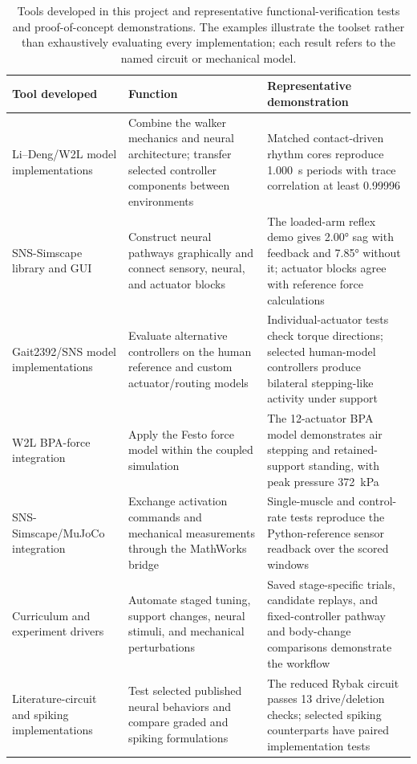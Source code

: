 \begin{table}[htbp]
\caption[Tools developed and representative demonstrations]{Tools developed in this project and representative functional-verification tests and proof-of-concept demonstrations. The examples illustrate the toolset rather than exhaustively evaluating every implementation; each result refers to the named circuit or mechanical model.}
\label{tab:sns_capability}
\small
\begin{tabularx}{\textwidth}{@{}>{\raggedright\arraybackslash}p{}*{2}{>{\raggedright\arraybackslash}X}@{}}
\toprule
\textbf{Tool developed} & \textbf{Function} & \textbf{Representative demonstration} \\
\midrule
Li--Deng/W2L model implementations & Combine the walker mechanics and neural architecture; transfer selected controller components between environments & Matched contact-driven rhythm cores reproduce \qty{1.000}{\second} periods with trace correlation at least 0.99996 \\
SNS-Simscape library and GUI & Construct neural pathways graphically and connect sensory, neural, and actuator blocks & The loaded-arm reflex demo gives \ang{2.00} sag with feedback and \ang{7.85} without it; actuator blocks agree with reference force calculations \\
Gait2392/SNS model implementations & Evaluate alternative controllers on the human reference and custom actuator/routing models & Individual-actuator tests check torque directions; selected human-model controllers produce bilateral stepping-like activity under support \\
W2L BPA-force integration & Apply the Festo force model within the coupled simulation & The 12-actuator BPA model demonstrates air stepping and retained-support standing, with peak pressure \qty{372}{\kPa} \\
SNS-Simscape/MuJoCo integration & Exchange activation commands and mechanical measurements through the MathWorks bridge & Single-muscle and control-rate tests reproduce the Python-reference sensor readback over the scored windows \\
Curriculum and experiment drivers & Automate staged tuning, support changes, neural stimuli, and mechanical perturbations & Saved stage-specific trials, candidate replays, and fixed-controller pathway and body-change comparisons demonstrate the workflow \\
Literature-circuit and spiking implementations & Test selected published neural behaviors and compare graded and spiking formulations & The reduced Rybak circuit passes 13 drive/deletion checks; selected spiking counterparts have paired implementation tests \\
\bottomrule
\end{tabularx}
\end{table}

